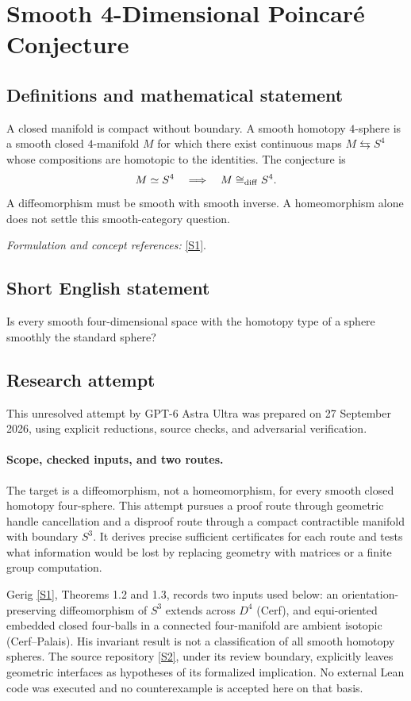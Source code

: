 \documentclass[11pt]{article}
\begin{document}
\section*{\texorpdfstring{Smooth 4-Dimensional Poincaré Conjecture}{Smooth 4-Dimensional Poincaré Conjecture}}\label{statement}
\subsection{Definitions and mathematical statement}
A closed manifold is compact without boundary. A smooth homotopy $4$-sphere is a smooth closed $4$-manifold $M$ for which there exist continuous maps $M\leftrightarrows S^4$ whose compositions are homotopic to the identities. The conjecture is
\[
 M\simeq S^4\quad\Longrightarrow\quad M\cong_{\rm diff} S^4.
\]
A diffeomorphism must be smooth with smooth inverse. A homeomorphism alone does not settle this smooth-category question.
\par\smallskip\textit{Formulation and concept references:} \href{https://arxiv.org/pdf/1905.10938}{[S1]}.

\subsection{Short English statement}
Is every smooth four-dimensional space with the homotopy type of a sphere smoothly the standard sphere?
\subsection{Research attempt}
This unresolved attempt by GPT-6 Astra Ultra was prepared on 27 September
2026, using explicit reductions, source checks, and adversarial verification.

\paragraph{Scope, checked inputs, and two routes.}
The target is a diffeomorphism, not a homeomorphism, for every smooth
closed homotopy four-sphere. This attempt pursues a proof route through
geometric handle cancellation and a disproof route through a compact
contractible manifold with boundary $S^3$. It derives precise sufficient
certificates for each route and tests what information would be lost by
replacing geometry with matrices or a finite group computation.

Gerig \href{https://arxiv.org/pdf/1905.10938}{[S1]}, Theorems 1.2 and 1.3, records two inputs used below: an
orientation-preserving diffeomorphism of $S^3$ extends across $D^4$
(Cerf), and equi-oriented embedded closed four-balls in a connected
four-manifold are ambient isotopic (Cerf--Palais). His invariant result
is not a classification of all smooth homotopy spheres. The source
repository \href{https://github.com/toffee-desuwa/smooth4pc-t73-lean/blob/main/docs/INDEPENDENT_REVIEW.md}{[S2]}, under its review boundary, explicitly leaves geometric
interfaces as hypotheses of its formalized implication. No external Lean
code was executed and no counterexample is accepted here on that basis.
\end{document}
